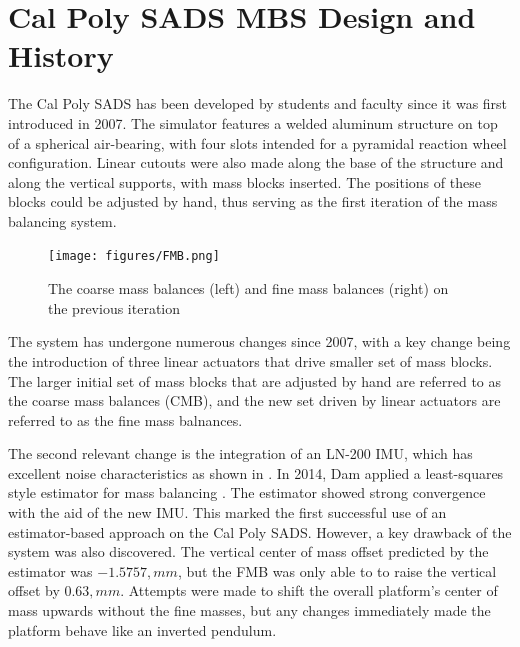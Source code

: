 \section{Cal Poly SADS MBS Design and History} 

The Cal Poly SADS has been developed by students and faculty since it was first introduced in 2007. The simulator features a welded aluminum structure on top of a spherical air-bearing, with four slots intended for a pyramidal reaction wheel configuration. Linear cutouts were also made along the base of the structure and along the vertical supports, with mass blocks inserted. The positions of these blocks could be adjusted by hand, thus serving as the first iteration of the mass balancing system. 

\begin{figure}[h]\label{fig:gillman_final_work}
    \centering
    \texttt{[image: figures/FMB.png]}
    \caption{The coarse mass balances (left) and fine mass balances (right) on the previous iteration~\cite{gilman_automatic_2024}}
\end{figure}

The system has undergone numerous changes since 2007, with a key change being the introduction of three linear actuators that drive smaller set of mass blocks. The larger initial set of mass blocks that are adjusted by hand are referred to as the coarse mass balances (CMB), and the new set driven by linear actuators are referred to as the fine mass balnances.

The second relevant change is the integration of an LN-200 IMU, which has excellent noise characteristics as shown in . In 2014, Dam applied a least-squares style estimator for mass balancing \cite{dam_applied_2014}. The estimator showed strong convergence with the aid of the new IMU. This marked the first successful use of an estimator-based approach on the Cal Poly SADS. However, a key drawback of the system was also discovered. The vertical center of mass offset predicted by the estimator was $-1.5757,\si{mm}$, but the FMB was only able to to raise the vertical offset by $0.63,\si{mm}$. Attempts were made to shift the overall platform's center of mass upwards without the fine masses, but any changes immediately made the platform behave like an inverted pendulum.

